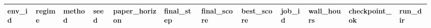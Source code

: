 \begin{tabular}{llllllllllll}
\toprule
env\_id & regime & method & seed & paper\_horizon & final\_step & final\_score & best\_score & job\_id & wall\_hours & checkpoint\_ok & run\_dir \\
\midrule
\bottomrule
\end{tabular}

